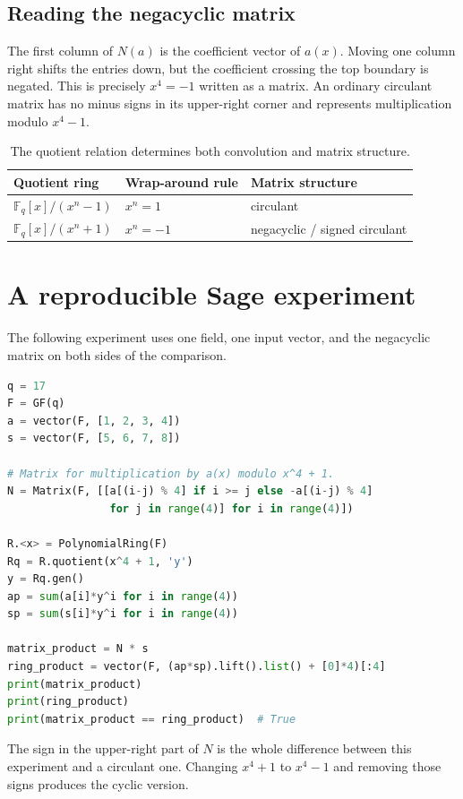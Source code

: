 \subsection{Reading the negacyclic matrix}

The first column of $N(a)$ is the coefficient vector of $a(x)$. Moving one column right shifts the entries down, but the coefficient crossing the top boundary is negated. This is precisely $x^4=-1$ written as a matrix. An ordinary circulant matrix has no minus signs in its upper-right corner and represents multiplication modulo $x^4-1$.

\begin{table}[H]
\centering
\begin{tabular}{lll}
\toprule
Quotient ring & Wrap-around rule & Matrix structure \\
\midrule
$\mathbb{F}_q[x]/(x^n-1)$ & $x^n=1$ & circulant \\
$\mathbb{F}_q[x]/(x^n+1)$ & $x^n=-1$ & negacyclic / signed circulant \\
\bottomrule
\end{tabular}
\caption{The quotient relation determines both convolution and matrix structure.}
\end{table}

\section{A reproducible Sage experiment}

The following experiment uses one field, one input vector, and the negacyclic matrix on both sides of the comparison.

\begin{lstlisting}[language=Python]
q = 17
F = GF(q)
a = vector(F, [1, 2, 3, 4])
s = vector(F, [5, 6, 7, 8])

# Matrix for multiplication by a(x) modulo x^4 + 1.
N = Matrix(F, [[a[(i-j) % 4] if i >= j else -a[(i-j) % 4]
                for j in range(4)] for i in range(4)])

R.<x> = PolynomialRing(F)
Rq = R.quotient(x^4 + 1, 'y')
y = Rq.gen()
ap = sum(a[i]*y^i for i in range(4))
sp = sum(s[i]*y^i for i in range(4))

matrix_product = N * s
ring_product = vector(F, (ap*sp).lift().list() + [0]*4)[:4]
print(matrix_product)
print(ring_product)
print(matrix_product == ring_product)  # True
\end{lstlisting}

The sign in the upper-right part of $N$ is the whole difference between this experiment and a circulant one. Changing $x^4+1$ to $x^4-1$ and removing those signs produces the cyclic version.

